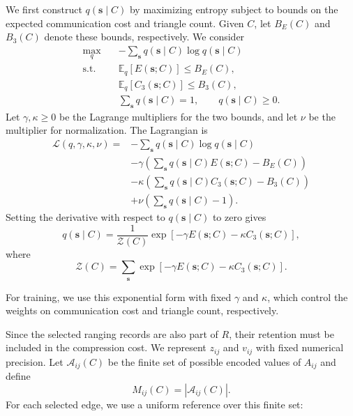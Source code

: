 We first construct $q(\mathbf s\mid C)$ by maximizing entropy subject to bounds on the expected communication cost and triangle count. Given $C$, let $B_E(C)$ and $B_3(C)$ denote these bounds, respectively. We consider
\begin{equation}
    \begin{aligned}
    \max_q\quad&
    -\sum_{\mathbf s}q(\mathbf s\mid C)
    \log q(\mathbf s\mid C)\\
    \mathrm{s.t.}\quad&
    \mathbb E_q[E(\mathbf s;C)]\le B_E(C),\\
    &\mathbb E_q[C_3(\mathbf s;C)]\le B_3(C),\\
    &\sum_{\mathbf s}q(\mathbf s\mid C)=1,\qquad
    q(\mathbf s\mid C)\ge0.
    \end{aligned}
    \label{eq:max_entropy_formulation}
\end{equation}
Let $\gamma,\kappa\ge0$ be the Lagrange multipliers for the two bounds, and let $\nu$ be the multiplier for normalization. The Lagrangian is
\[
\begin{aligned}
    \mathcal L(q,\gamma,\kappa,\nu)
    ={}&
    -\sum_{\mathbf s}q(\mathbf s\mid C)
    \log q(\mathbf s\mid C)\\
    &-\gamma\left(
    \sum_{\mathbf s}q(\mathbf s\mid C)E(\mathbf s;C)-B_E(C)
    \right)\\
    &-\kappa\left(
    \sum_{\mathbf s}q(\mathbf s\mid C)C_3(\mathbf s;C)-B_3(C)
    \right)\\
    &+\nu\left(\sum_{\mathbf s}q(\mathbf s\mid C)-1\right).
\end{aligned}
\]
Setting the derivative with respect to $q(\mathbf s\mid C)$ to zero gives
\begin{equation}
    q(\mathbf s\mid C)
    =
    \frac1{\mathcal Z(C)}
    \exp\!\left[
    -\gamma E(\mathbf s;C)
    -\kappa C_3(\mathbf s;C)
    \right],
    \label{eq:structured_prior}
\end{equation}
where
\[
    \mathcal Z(C)
    =
    \sum_{\mathbf s}
    \exp\!\left[
    -\gamma E(\mathbf s;C)
    -\kappa C_3(\mathbf s;C)
    \right].
\]

For training, we use this exponential form with fixed $\gamma$ and $\kappa$, which control the weights on communication cost and triangle count, respectively.

Since the selected ranging records are also part of $R$, their retention must be included in the compression cost. We represent $z_{ij}$ and $v_{ij}$ with fixed numerical precision. Let $\mathcal A_{ij}(C)$ be the finite set of possible encoded values of $A_{ij}$ and define
\[
    M_{ij}(C)=|\mathcal A_{ij}(C)|.
\]
For each selected edge, we use a uniform reference over this finite set:

